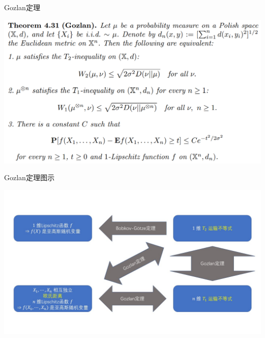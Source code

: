 \documentclass{beamer}
\begin{document}
\begin{frame}{Gozlan定理}
\begin{center}
    \includegraphics[width=1.0\textwidth, frame]{figures/4-31-thm.png}
\end{center}
\end{frame}

\begin{frame}{Gozlan定理图示}
\begin{center}
    \includegraphics[width=1.0\textwidth]{figures/structure03.JPG}
\end{center}
\end{frame}
\end{document}
